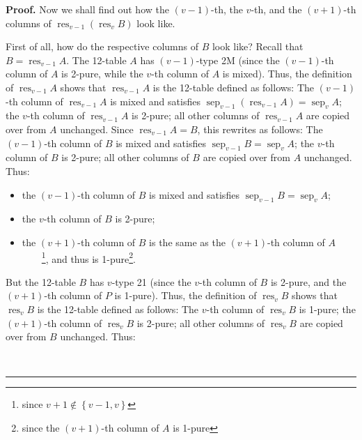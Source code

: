\documentclass[numbers=enddot,12pt,final,onecolumn,notitlepage]{scrartcl}%
\theoremstyle{definition}
\newenvironment{proof}[1][Proof]{\noindent\textbf{#1.} }{\ \rule{0.5em}{0.5em}}
\newenvironment{verlong}{}{}
\begin{document}
\begin{verlong}
\begin{proof}
Now we shall find out how the $\left(  v-1\right)  $-th, the $v$-th, and the
$\left(  v+1\right)  $-th columns of $\operatorname*{res}\nolimits_{v-1}%
\left(  \operatorname*{res}\nolimits_{v}B\right)  $ look like.

First of all, how do the respective columns of $B$ look like? Recall that
$B=\operatorname*{res}\nolimits_{v-1}A$. The 12-table $A$ has $\left(
v-1\right)  $-type 2M (since the $\left(  v-1\right)  $-th column of $A$ is
2-pure, while the $v$-th column of $A$ is mixed). Thus, the definition of
$\operatorname*{res}_{v-1}A$ shows that $\operatorname*{res}_{v-1}A$ is the
12-table defined as follows: The $\left(  v-1\right)  $-th column of
$\operatorname*{res}_{v-1}A$ is mixed and satisfies $\operatorname*{sep}%
\nolimits_{v-1}\left(  \operatorname*{res}\nolimits_{v-1}A\right)
=\operatorname*{sep}\nolimits_{v}A$; the $v$-th column of $\operatorname*{res}%
\nolimits_{v-1}A$ is 2-pure; all other columns of $\operatorname*{res}%
\nolimits_{v-1}A$ are copied over from $A$ unchanged. Since
$\operatorname*{res}\nolimits_{v-1}A=B$, this rewrites as follows: The
$\left(  v-1\right)  $-th column of $B$ is mixed and satisfies
$\operatorname*{sep}\nolimits_{v-1}B=\operatorname*{sep}\nolimits_{v}A$; the
$v$-th column of $B$ is 2-pure; all other columns of $B$ are copied over from
$A$ unchanged. Thus:

\begin{itemize}
\item the $\left(  v-1\right)  $-th column of $B$ is mixed and satisfies
$\operatorname*{sep}\nolimits_{v-1}B=\operatorname*{sep}\nolimits_{v}A$;

\item the $v$-th column of $B$ is 2-pure;

\item the $\left(  v+1\right)  $-th column of $B$ is the same as the $\left(
v+1\right)  $-th column of $A$\ \ \ \ \footnote{since $v+1\notin\left\{
v-1,v\right\}  $}, and thus is 1-pure\footnote{since the $\left(  v+1\right)
$-th column of $A$ is 1-pure}.
\end{itemize}

But the 12-table $B$ has $v$-type 21 (since the $v$-th column of $B$ is
2-pure, and the $\left(  v+1\right)  $-th column of $P$ is 1-pure). Thus, the
definition of $\operatorname*{res}\nolimits_{v}B$ shows that
$\operatorname*{res}\nolimits_{v}B$ is the 12-table defined as follows: The
$v$-th column of $\operatorname*{res}\nolimits_{v}B$ is 1-pure; the $\left(
v+1\right)  $-th column of $\operatorname*{res}\nolimits_{v}B$ is 2-pure; all
other columns of $\operatorname*{res}\nolimits_{v}B$ are copied over from $B$
unchanged. Thus:


\end{proof}
\end{verlong}
\end{document}

